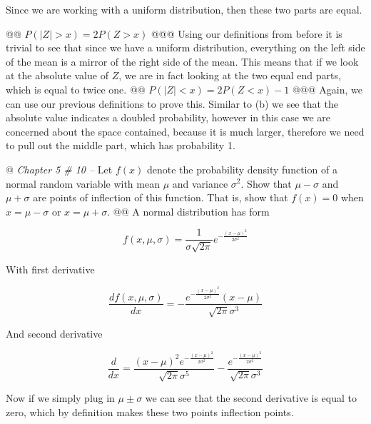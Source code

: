 \documentclass[10pt]{article}
\begin{document}
\begin{easylist}[enumerate]
    Since we are working with a uniform distribution, then these two parts are equal.

    @@ $P(|Z| > x) = 2P(Z > x)$
    @@@ Using our definitions from before it is trivial to see that since we have a uniform distribution, everything on
    the left side of the mean is a mirror of the right side of the mean. This means that if we look at the absolute
    value of $Z$, we are in fact looking at the two equal end parts, which is equal to twice one.
    @@ $P(|Z| < x) = 2P(Z < x) - 1$
    @@@ Again, we can use our previous definitions to prove this. Similar to (b) we see that the absolute value
    indicates a doubled probability, however in this case we are concerned about the space contained, because it is much
    larger, therefore we need to pull out the middle part, which has probability 1.

    @ \textit{Chapter 5 \# 10 --} Let $f(x)$ denote the probability density function of a normal random variable with
    mean $\mu$ and variance $\sigma^2$. Show that $\mu - \sigma$ and $\mu + \sigma$ are points of inflection of this
    function. That is, show that $f(x) = 0$ when $x = \mu - \sigma$ or $x = \mu + \sigma$.
    @@ A normal distribution has form

    \[ f(x, \mu, \sigma) = \frac{1}{\sigma\sqrt{2\pi}} e^{ -\frac{(x-\mu)^2}{2\sigma^2} } \]

    With first derivative

    \[ \frac{df(x, \mu, \sigma)}{dx} = -\frac{e^{-\frac{{(x - \mu)}^2}{2 \sigma^2}} (x - \mu)}{\sqrt{2 \pi} \sigma^3} \]

    And second derivative

    \[ \frac{d}{dx} = \frac{(x-\mu )^2 e^{-\frac{(x-\mu )^2}{2 \sigma ^2}}}{\sqrt{2 \pi } \sigma ^5}-
                        \frac{e^{-\frac{(x-\mu )^2}{2 \sigma^2}}}{\sqrt{2 \pi } \sigma ^3} \]

    Now if we simply plug in $\mu \pm \sigma$ we can see that the second derivative is equal to zero, which by
    definition makes these two points inflection points.
\end{easylist}
\end{document}
